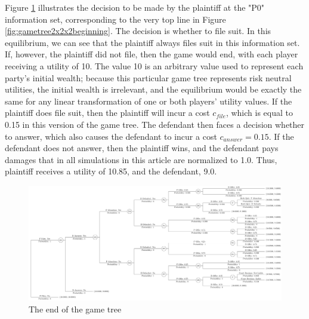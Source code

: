 \documentclass{article}
\begin{document}
Figure \ref{fig:gametree2x2x2end} illustrates the decision to be made by the plaintiff at the "P0" information set, corresponding to the very top line in Figure \ref{fig:gametree2x2x2beginning}. The decision is whether to file suit. In this equilibrium, we can see that the plaintiff always files suit in this information set. If, however, the plaintiff did not file, then the game would end, with each player receiving a utility of 10. The value 10 is an arbitrary value used to represent each party's initial wealth; because this particular game tree represents risk neutral utilities, the initial wealth is irrelevant, and the equilibrium would be exactly the same for any linear transformation of one or both players' utility values. If the plaintiff does file suit, then the plaintiff will incur a cost $c_{file}$, which is equal to 0.15 in this version of the game tree. The defendant then faces a decision whether to answer, which also causes the defendant to incur a cost $c_{answer}=0.15$. If the defendant does not answer, then the plaintiff wins, and the defendant pays damages that in all simulations in this article are normalized to 1.0. Thus, plaintiff receives a utility of 10.85, and the defendant, 9.0.

\begin{figure}[h!]
\centering
\includegraphics[scale=0.25, trim={0in 0in 0in 0in}, clip]{../Figures/game tree 2x2x2 end.pdf}
\caption{The end of the game tree}
\label{fig:gametree2x2x2end}
\end{figure}
\end{document}
